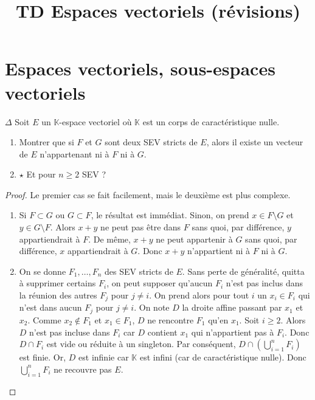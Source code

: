 \documentclass[french,a4paper]{article}
\title{TD Espaces vectoriels (révisions)}
\newcommand{\K}{\mathbb{K}}
\theoremstyle{plain}
\theoremstyle{definition}
\theoremstyle{remark}
\begin{document}
\maketitle

\section{Espaces vectoriels, sous-espaces vectoriels}

\begin{ex}[Moulin.01]{$\Delta$}
	Soit $E$ un $\K$-espace vectoriel où $\K$ est un corps de caractéristique nulle.
	\begin{enumerate}
		\item Montrer que si $F$ et $G$ sont deux SEV stricts de $E$, alors il existe un vecteur de $E$ n'appartenant ni à $F$ ni à $G$.
		\item $\star$ Et pour $n\geqslant 2$ SEV ?
	\end{enumerate}
\end{ex}
\begin{proof}
	Le premier cas se fait facilement, mais le deuxième est plus complexe.
	\begin{enumerate}
		\item Si $F\subset G$ ou $G\subset F$, le résultat est immédiat. Sinon, on prend $x\in F\setminus G$ et $y\in G\setminus F$. Alors $x+y$ ne peut pas être dans $F$ sans quoi, par différence, $y$ appartiendrait à $F$. De même, $x+y$ ne peut appartenir à $G$ sans quoi, par différence, $x$ appartiendrait à $G$. Donc $x+y$ n'appartient ni à $F$ ni à $G$.
		\item On se donne $F_1,\ldots, F_n$ des SEV stricts de $E$. Sans perte de généralité, quitta à supprimer certains $F_i$, on peut supposer qu'aucun $F_i$ n'est pas inclus dans la réunion des autres $F_j$ pour $j\ne i$. On prend alors pour tout $i$ un $x_i\in F_i$ qui n'est dans aucun $F_j$ pour $j\ne i$. On note $D$ la droite affine passant par $x_1$ et $x_2$. Comme $x_2\notin F_1$ et $x_1\in F_1$, $D$ ne rencontre $F_1$ qu'en $x_1$. Soit $i\geqslant 2$. Alors $D$ n'est pas incluse dans $F_i$ car $D$ contient $x_1$ qui n'appartient pas à $F_i$. Donc $D\cap F_i$ est vide ou réduite à un singleton. Par conséquent, $D\displaystyle \cap\left(\bigcup_{i=1}^n F_i\right)$ est finie. Or, $D$ est infinie car $\K$ est infini (car de caractéristique nulle). Donc $\displaystyle\bigcup_{i=1}^nF_i$ ne recouvre pas $E$.
	\end{enumerate}
\end{proof}
\end{document}
